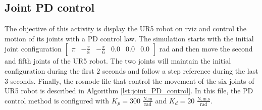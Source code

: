 \subsection{Joint PD control}
The objective of this activity is display the UR5 robot on rviz and control the motion of its joints with a PD control law. The simulation starts with the initial joint configuration $\begin{bmatrix} \pi & -\frac{\pi}{8} & -\frac{\pi}{6} & 0.0 & 0.0 & 0.0 \end{bmatrix}$ rad and then move the second and fifth joints of the UR5 robot. The two joints will maintain the initial configuration during the first $2$ seconds and follow a step reference during the last $3$ seconds. Finally, the rosnode file that control the movement of the six joints of UR5 robot is described in Algorithm \ref{lst:joint_PD_control}. In this file, the PD control method is configured with $K_p=300$ $\mathrm{\frac{N.m}{rad}}$ and $K_d=20$ $\mathrm{\frac{N.m.s}{rad}}$. 


